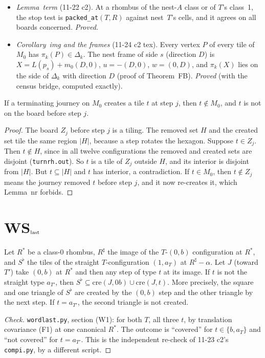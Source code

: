 \documentclass[11pt]{article}
\theoremstyle{definition}\newtheorem{definition}[theorem]{Definition}\newtheorem{remark}[theorem]{Remark}
\begin{document}
\begin{itemize}
\item[(F7)] \emph{Lemma~term} (11-22 c2). At a rhombus of the nest-$A$ class or of $T$'s class~1, the stop test is \texttt{packed\_at}$(T,R)$ against nest~$T$'s cells, and it agrees on all boards concerned. \emph{Proved.}
\item[(F8)] \emph{Corollary~img and the frames} (11-24 c2 tex). Every vertex $P$ of every tile of $M_0$ has $\pi_k(P)\in\Delta_k$. The nest frame of side $s$ (direction $D$) is $X=L(p_s)+m_0(D,0)$, $u=-(D,0)$, $w=(0,D)$, and $\pi_k(X)$ lies on the side of $\Delta_k$ with direction $D$ (proof of Theorem~FB). \emph{Proved} (with the census bridge, computed exactly).
\end{itemize}

\begin{lemma}\label{lem:new}
If a terminating journey on $M_0$ creates a tile $t$ at step $j$, then $t\notin M_0$, and $t$ is not on the board before step $j$.
\end{lemma}
\begin{proof}
The board $Z_j$ before step $j$ is a tiling. The removed set $H$ and the created set tile the same region $|H|$, because a step rotates the hexagon. Suppose $t\in Z_j$. Then $t\notin H$, since in all twelve configurations the removed and created sets are disjoint (\texttt{turnrh.out}). So $t$ is a tile of $Z_j$ outside $H$, and its interior is disjoint from $|H|$. But $t\subseteq|H|$ and $t$ has interior, a contradiction. If $t\in M_0$, then $t\notin Z_j$ means the journey removed $t$ before step $j$, and it now re-creates it, which Lemma~nr forbids.
\end{proof}

\section{WS$_{\rm last}$}\label{sec:wslast}
\begin{proposition}\label{prop:W1}
Let $R^\ast$ be a class-0 rhombus, $R^\sharp$ the image of the $T$-$(0,b)$ configuration at $R^\ast$, and $S^\flat$ the tiles of the straight $T$-configuration $(1,a_T)$ at $R^\sharp-\alpha$. Let $J$ (toward $T'$) take $(0,b)$ at $R^\ast$ and then any step of type $t$ at its image. If $t$ is not the straight type $a_{T'}$, then $S^\flat\subseteq\mathrm{cre}(J,0b)\cup\mathrm{cre}(J,t)$. More precisely, the square and one triangle of $S^\flat$ are created by the $(0,b)$ step and the other triangle by the next step. If $t=a_{T'}$, the second triangle is not created.
\end{proposition}
\begin{proof}[Check]
\texttt{wordlast.py}, section (W1): for both $T$, all three $t$, by translation covariance (F1) at one canonical $R^\ast$. The outcome is ``covered'' for $t\in\{b,a_T\}$ and ``not covered'' for $t=a_{T'}$. This is the independent re-check of 11-23 c2's \texttt{compi.py}, by a different script.
\end{proof}
\end{document}
